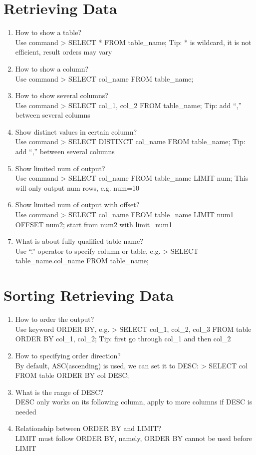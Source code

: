\documentclass[10pt,a4paper,oneside]{article}
\begin{document}
\section{Retrieving Data}
\begin{enumerate}[1.]
\item  How to show a table?  \\
Use command > SELECT * FROM table\_name; Tip: * is wildcard, it is not efficient, result orders may vary
\item   How to show a column? \\
Use command > SELECT col\_name FROM table\_name;
\item  How to show several columns?  \\
Use command > SELECT col\_1, col\_2 FROM table\_name; Tip: add ``,'' between several columns
\item Show distinct values in certain column?   \\
Use command > SELECT DISTINCT col\_name FROM table\_name; Tip: add ``,'' between several columns
\item  Show limited num of output?  \\
Use command > SELECT col\_name FROM table\_name LIMIT num; This will only output num rows, e.g. num=10
\item  Show limited num of output with offset?  \\
Use command > SELECT col\_name FROM table\_name LIMIT num1 OFFSET num2; start from num2 with limit=num1 
\item   What is about fully qualified table name? \\
Use ``.'' operator to specify column or table, e.g. > SELECT table\_name.col\_name FROM table\_name;
\end{enumerate}
\section{Sorting Retrieving Data}
\begin{enumerate}[1.]
\item   How to order the output? \\
Use keyword ORDER BY, e.g. > SELECT col\_1, col\_2, col\_3 FROM table ORDER BY col\_1, col\_2; Tip: first go through col\_1 and then col\_2
\item How to specifying order direction?   \\
By default, ASC(ascending) is used, we can set it to DESC: > SELECT col FROM table ORDER BY col DESC;
\item What is the range of DESC?   \\
DESC only works on its following column, apply to more columns if DESC is needed
\item  Relationship between ORDER BY and LIMIT?  \\
LIMIT must follow ORDER BY, namely, ORDER BY cannot be used before LIMIT
\end{enumerate}
\end{document}
